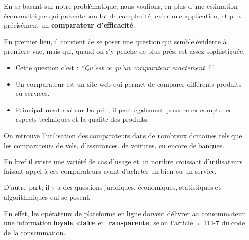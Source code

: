 \documentclass[
  12pt,
]{report}
\providecommand{\tightlist}{%
  \setlength{\itemsep}{0pt}\setlength{\parskip}{0pt}}\usepackage{longtable,booktabs,array}
\begin{document}
En se basant sur notre problématique, nous voulions, en plus d'une
estimation économétrique qui présente son lot de complexité, créer une
application, et plus précisément un \textbf{comparateur d'efficacité}.

En premier lieu, il convient de se poser une question qui semble
évidente à première vue, mais qui, quand on s'y penche de plus près, est
assez sophistiquée.

\begin{itemize}
\tightlist
\item
  Cette question c'est : \emph{``Qu'est ce qu'un comparateur exactement
  ?''}
\end{itemize}

\begin{tcolorbox}[enhanced jigsaw, colframe=quarto-callout-tip-color-frame, colbacktitle=quarto-callout-tip-color!10!white, left=2mm, rightrule=.15mm, toprule=.15mm, bottomtitle=1mm, breakable, colback=white, titlerule=0mm, coltitle=black, arc=.35mm, opacitybacktitle=0.6, opacityback=0, bottomrule=.15mm, leftrule=.75mm, toptitle=1mm, title=\textcolor{quarto-callout-tip-color}{\faLightbulb}\hspace{0.5em}{Définition}]

\begin{itemize}
\item
  Un comparateur est un site web qui permet de comparer différents
  produits ou services.
\item
  Principalement axé sur les prix, il peut également prendre en compte
  les aspects techniques et la qualité des produits.
\end{itemize}

\end{tcolorbox}

On retrouve l'utilisation des comparateurs dans de nombreux domaines
tels que les comparateurs de vols, d'assurances, de voitures, ou encore
de banques.

En bref il existe une variété de cas d'usage et un nombre croissant
d'utilisateurs faisant appel à ces comparateurs avant d'acheter un bien
ou un service.

D'autre part, il y a des questions juridiques, économiques, statistiques
et algorithmiques qui se posent.

En effet, les opérateurs de plateforme en ligne doivent délivrer au
consommateur une information \textbf{loyale}, \textbf{claire} et
\textbf{transparente}, selon l'article
\href{https://www.legifrance.gouv.fr/codes/article_lc/LEGIARTI000033219601}{L.
111-7 du code de la consommation}.
\end{document}

